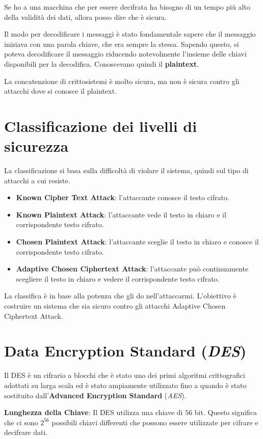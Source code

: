 Se ho a una macchina che per essere decifrata ha bisogno di un tempo più alto della validità 
dei dati, allora posso dire che è sicura.

Il modo per decodificare i messaggi è stato fondamentale sapere che il messaggio iniziava con
una parola chiave, che era sempre la stessa. Sapendo questo, si poteva decodificare il messaggio
riducendo notevolmente l'insieme delle chiavi disponibili per la decodifica.
Conoscevano quindi il \textbf{plaintext}.

La concatenzione di crittosistemi è molto sicura, ma non è sicura contro gli attacchi
dove si conosce il plaintext.

\section{Classificazione dei livelli di sicurezza}
La classificazione si basa sulla difficoltà di violare il sistema, quindi sul tipo di 
attacchi a cui resiste.
\begin{itemize}
    \item \textbf{Known Cipher Text Attack}: l'attaccante conosce il testo cifrato.
    \item \textbf{Known Plaintext Attack}: l'attaccante vede il testo in chiaro e il corrispondente testo cifrato.
    \item \textbf{Chosen Plaintext Attack}: l'attaccante sceglie il testo in chiaro e conosce il corrispondente testo cifrato.
    \item \textbf{Adaptive Chosen Ciphertext Attack}: l'attaccante può continuamente scegliere il testo in chiaro e vedere il corrispondente testo cifrato.
\end{itemize}
La classifica è in base alla potenza che gli do nell'attaccarmi.
L'obiettivo è costruire un sistema che sia sicuro contro 
gli attacchi Adaptive Chosen Ciphertext Attack.
\section{Data Encryption Standard (\textit{DES})}
Il DES è un cifrario a blocchi che è stato uno dei primi algoritmi
crittografici adottati su larga scala ed è stato ampiamente utilizzato
fino a quando è stato sostituito dall'\textbf{Advanced Encryption Standard} (\textit{AES}).

\textbf{Lunghezza della Chiave}: Il DES utilizza una chiave di $56$ bit.
Questo significa che ci sono $2^{56}$ possibili chiavi differenti che possono
essere utilizzate per cifrare e decifrare dati.

